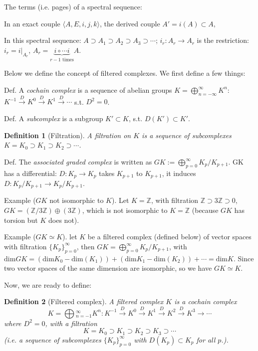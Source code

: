 \documentclass{article}
\theoremstyle{mystyle}
\newtheorem*{definition}{Definition}%
\theoremstyle{remark}
\numberwithin{equation}{section}
\begin{document}
The terms (i.e. pages) of a spectral sequence:

In an exact couple $\langle A,E,i,j,k\rangle$, the derived couple $A'=i(A)\subset A$, 

In this spectral sequence: $A\supset A_1\supset A_2\supset A_3\supset \cdots$; $i_r\colon A_r\rightarrow A_r$ is the restriction: $i_r = i|_{A_r}$, $A_r = \underbrace{i\circ \cdots i}_{r-1\text{ times}}A$. 
 

Below we define the concept of filtered complexes. We first define a few things:

Def. A \emph{cochain complex} is a sequence of abelian groups $K = \bigoplus_{n=-\infty}^\infty K^n$: $K^{-1}\xrightarrow{D} K^0\xrightarrow{D} K^1\xrightarrow{D} \cdots$ s.t. $D^2=0$.

Def. A \emph{subcomplex} is a subgroup $K'\subset K$, s.t. $D(K')\subset K'$.

\begin{definition}[Filtration]
A \emph{filtration} on $K$ is a sequence of subcomplexes $K = K_0\supset K_1\supset K_2\supset \cdots$.
\end{definition}

Def. The \emph{associated graded complex} is written as $GK:= \bigoplus_{p=0}^\infty K_p/K_{p+1}$. GK has a differential: $D\colon K_p\rightarrow K_p$ takes $K_{p+1}$ to $K_{p+1}$, it induces $D\colon K_p/K_{p+1}\rightarrow K_p/K_{p+1}$.



Example ($GK$ not isomorphic to $K$). Let $K = \mathbb{Z}$, with filtration $\mathbb{Z}\supset 3\mathbb{Z}\supset 0$, $GK = (\mathbb{Z}/3\mathbb{Z})\oplus (3\mathbb{Z})$, which is not isomorphic to $K = \mathbb{Z}$ (because $GK$ has torsion but $K$ does not).


Example ($GK\simeq K$). let $K$ be a filtered complex (defined below) of vector spaces with filtration $\{K_p\}_{p=0}^\infty$, then $GK = \bigoplus_{p=0}^\infty K_p/K_{p+1}$, with $\mathrm{dim}GK = (\mathrm{dim}K_0-\mathrm{dim}(K_1))+
(\mathrm{dim}K_1-\mathrm{dim}(K_2))+\cdots = \mathrm{dim}K$. Since two vector spaces of the same dimension are isomorphic, so we have $GK\simeq K$.


Now, we are ready to define:

\begin{definition}[Filtered complex]
A \emph{filtered complex} $K$ is a cochain complex 
$$K = \bigoplus{_{n=-1}^\infty}K^n\colon K^{-1}\xrightarrow {D}K^0\xrightarrow{D}K^1\xrightarrow{D} K^2 \xrightarrow{D} K^3 \rightarrow \cdots$$
where $D^2=0$, with a filtration
$$K = K_0\supset K_1\supset K_2\supset K_3\supset \cdots$$
(i.e. a sequence of subcomplexes $\{K_p\}_{p=0}^\infty$ with $D(K_p)\subset K_p$ for all $p$.).
\end{definition}
\end{document}
